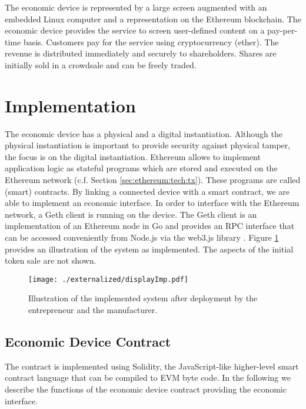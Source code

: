 The economic device is represented by a large screen augmented with an embedded Linux computer and a representation on the Ethereum blockchain. The economic device provides the service to screen user-defined content on a pay-per-time basis. Customers pay for the service using cryptocurrency (ether). The revenue is distributed immediately and securely to shareholders. Shares are initially sold in a crowdsale and can be freely traded. 


\section{Implementation}

The economic device has a physical and a digital instantiation. Although the physical instantiation is important to provide security against physical tamper, the focus is on the digital instantiation. Ethereum allows to implement application logic as stateful programs which are stored and executed on the Ethereum network (c.f. Section \ref{sec:ethereum:tech:tx}). These programs are called (smart) contracts. By linking a connected device with a smart contract, we are able to implement an economic interface. In order to interface with the Ethereum network, a Geth client \parencite{Geth} is running on the device. The Geth client is an implementation of an Ethereum node in Go and provides an \ac{RPC} interface that can be accessed conveniently from Node.js via the web3.js library \parencite{Web3}. Figure \ref{fig:displayImp} provides an illustration of the system as implemented. The aspects of the initial token sale are not shown. 

\begin{figure}
 \centering
 \texttt{[image: ./externalized/displayImp.pdf]}
 \caption{Illustration of the implemented system after deployment by the entrepreneur and the manufacturer.}
 \label{fig:displayImp}
 \end{figure}


\subsection{Economic Device Contract}

The contract is implemented using Solidity, the JavaScript-like higher-level smart contract language that can be compiled to \ac{EVM} byte code. In the following we describe the functions of the economic device contract providing the economic interface.


